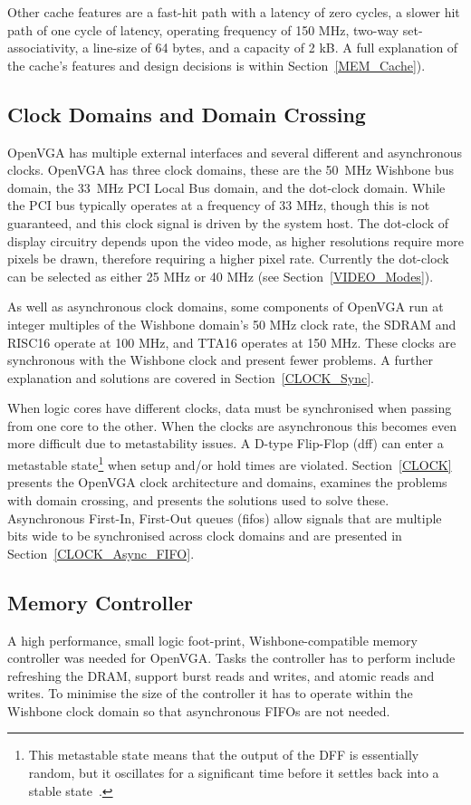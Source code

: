 Other cache features are a fast-hit path with a latency of zero cycles, a slower
hit path of one cycle of latency, operating frequency of 150 MHz, two-way
set-associativity, a line-size of 64 bytes, and a capacity of 2 kB. A full
explanation of the cache's features and design decisions is within
Section~\ref{MEM_Cache}).


\subsection{Clock Domains and Domain Crossing}
OpenVGA has multiple external interfaces and several different and asynchronous
clocks. OpenVGA has three clock domains, these are the 50~MHz Wishbone bus
domain, the 33~MHz PCI Local Bus domain, and the dot-clock domain. While the PCI
bus typically operates at a frequency of 33 MHz, though this is not guaranteed,
and this clock signal is driven by the system host. The dot-clock of display
circuitry depends upon the video mode, as higher resolutions require more pixels
be drawn, therefore requiring a higher pixel rate. Currently the dot-clock can be
selected as either 25 MHz or 40 MHz (see Section~\ref{VIDEO_Modes}).

As well as asynchronous clock domains, some components of OpenVGA run at integer
multiples of the Wishbone domain's 50 MHz clock rate, the SDRAM and RISC16
operate at 100 MHz, and TTA16 operates at 150 MHz. These clocks are synchronous
with the Wishbone clock and present fewer problems. A further explanation and
solutions are covered in Section~\ref{CLOCK_Sync}.

When logic cores have different clocks, data must be synchronised when passing
from one core to the other. When the clocks are asynchronous this becomes even
more difficult due to metastability issues. A D-type
Flip-Flop (\gls{dff}) can enter a
metastable state\footnote{This metastable state means that the output of the DFF
is essentially random, but it oscillates for a significant time before it settles
back into a stable state~\cite{Async_FIFO2}.} when setup and/or hold times are
violated. Section~\ref{CLOCK} presents the OpenVGA clock architecture and
domains, examines the problems with domain crossing, and presents the solutions
used to solve these. Asynchronous First-In, First-Out
queues (\gls{fifo}s) allow
signals that are multiple bits wide to be synchronised across clock domains and
are presented in Section~\ref{CLOCK_Async_FIFO}.


\subsection{Memory Controller}
\label{OPENVGA_Mem_Ctrl}
A high performance, small logic foot-print, Wishbone-compatible memory controller
was needed for OpenVGA. Tasks the controller has to perform include refreshing
the DRAM, support burst reads and writes, and atomic reads and writes. To
minimise the size of the controller it has to operate within the Wishbone clock
domain so that asynchronous FIFOs are not needed.

